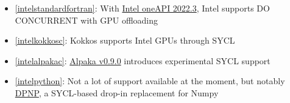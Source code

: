 \begin{itemize}
    \item \ref{intelstandardfortran}: With \href{https://www.intel.com/content/www/us/en/developer/articles/release-notes/fortran-compiler-release-notes.html}{Intel oneAPI 2022.3}, Intel supports DO CONCURRENT with GPU offloading
    \item \ref{intelkokkosc}: Kokkos supports Intel GPUs through SYCL
    \item \ref{intelalpakac}: \href{https://github.com/alpaka-group/alpaka/releases/tag/0.9.0}{Alpaka v0.9.0} introduces experimental SYCL support 
    \item \ref{intelpython}: Not a lot of support available at the moment, but notably \href{https://intelpython.github.io/dpnp/}{DPNP}, a SYCL-based drop-in replacement for Numpy
\end{itemize}